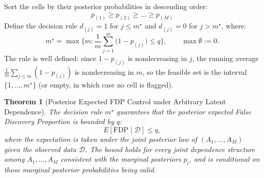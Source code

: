 \documentclass[11pt,a4paper]{article}
\newtheorem{theorem}{Theorem}
\begin{document}
Sort the cells by their posterior probabilities in descending order:
\[
p_{(1)} \ge p_{(2)} \ge \dots \ge p_{(M)}
\]
Define the decision rule $d_{(j)} = 1$ for $j \le m^\star$ and $d_{(j)} = 0$ for $j > m^\star$, where:
\begin{equation}\label{eq:fdp_cutoff}
m^\star = \max\Big\{ m : \frac{1}{m}\sum_{j=1}^{m}\big(1 - p_{(j)}\big) \le q \Big\}, \qquad \max \emptyset := 0. %
\end{equation}
The rule is well defined: since $1 - p_{(j)}$ is nondecreasing in $j$, the running average $\frac{1}{m}\sum_{j \le m}(1 - p_{(j)})$ is nondecreasing in $m$, so the feasible set is the interval $\{1, \dots, m^\star\}$ (or empty, in which case no cell is flagged). %

\begin{theorem}[Posterior Expected FDP Control under Arbitrary Latent Dependence]
The decision rule $m^\star$ guarantees that the posterior expected False Discovery Proportion is bounded by $q$:
\[
E[\mathrm{FDP} \mid \mathcal{D}] \le q,
\]
where the expectation is taken under the joint posterior law of $(A_1, \dots, A_M)$ given the observed data $\mathcal{D}$. The bound holds for \emph{every} joint dependence structure among $A_1, \dots, A_M$ consistent with the marginal posteriors $p_i$, and is conditional on those marginal posterior probabilities being valid. %
\end{theorem}
\end{document}
